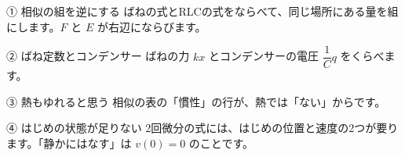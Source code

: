 \noindent\begin{minipage}[t]{0.485\linewidth}\vspace{0pt}
\begin{tsumazuki}{① 相似の組を逆にする}
ばねの式とRLCの式をならべて、同じ場所にある量を組にします。$F$ と $E$ が右辺にならびます。
\end{tsumazuki}
\end{minipage}\hfill
\begin{minipage}[t]{0.485\linewidth}\vspace{0pt}
\begin{tsumazuki}{② ばね定数とコンデンサー}
ばねの力 $kx$ とコンデンサーの電圧 $\dfrac1C q$ をくらべます。
\end{tsumazuki}
\end{minipage}

\noindent\begin{minipage}[t]{0.485\linewidth}\vspace{0pt}
\begin{tsumazuki}{③ 熱もゆれると思う}
相似の表の「慣性」の行が、熱では「ない」からです。
\end{tsumazuki}
\end{minipage}\hfill
\begin{minipage}[t]{0.485\linewidth}\vspace{0pt}
\begin{tsumazuki}{④ はじめの状態が足りない}
2回微分の式には、はじめの位置と速度の2つが要ります。「静かにはなす」は $v(0)=0$ のことです。
\end{tsumazuki}
\end{minipage}

